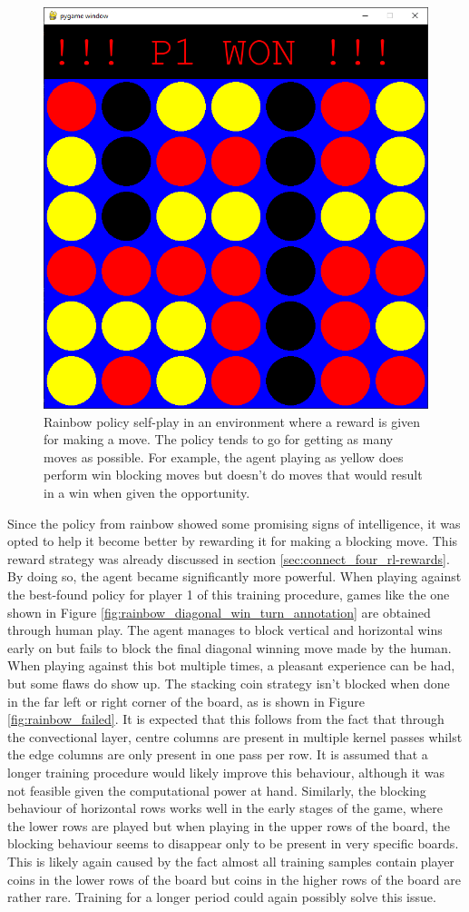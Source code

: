 \begin{figure}[ht]
    \centering
    \includegraphics[width=0.4\linewidth]{images/near_tie.png}
    \captionsetup{width=0.9\linewidth}
    \captionsetup{justification=centering}
    \caption{Rainbow policy self-play in an environment where a reward is given for making a move. The policy tends to go for getting as many moves as possible. For example, the agent playing as yellow does perform win blocking moves but doesn't do moves that would result in a win when given the opportunity.}
    \label{fig:tie}
\end{figure}

Since the policy from rainbow showed some promising signs of intelligence, it was opted to help it become better by rewarding it for making a blocking move.
This reward strategy was already discussed in section \ref{sec:connect_four_rl-rewards}.
By doing so, the agent became significantly more powerful.
When playing against the best-found policy for player 1 of this training procedure, games like the one shown in Figure \ref{fig:rainbow_diagonal_win_turn_annotation} are obtained through human play.
The agent manages to block vertical and horizontal wins early on but fails to block the final diagonal winning move made by the human.
When playing against this bot multiple times, a pleasant experience can be had, but some flaws do show up.
The stacking coin strategy isn't blocked when done in the far left or right corner of the board, as is shown in Figure \ref{fig:rainbow_failed}.
It is expected that this follows from the fact that through the convectional layer, centre columns are present in multiple kernel passes whilst the edge columns are only present in one pass per row.
It is assumed that a longer training procedure would likely improve this behaviour, although it was not feasible given the computational power at hand.
Similarly, the blocking behaviour of horizontal rows works well in the early stages of the game, where the lower rows are played but when playing in the upper rows of the board, the blocking behaviour seems to disappear only to be present in very specific boards.
This is likely again caused by the fact almost all training samples contain player coins in the lower rows of the board but coins in the higher rows of the board are rather rare.
Training for a longer period could again possibly solve this issue.

